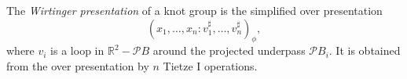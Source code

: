 The \textit{Wirtinger presentation} of a knot group is the simplified over presentation
$$(x_1, \ldots, x_n : v_1^\sharp, \ldots, v_n^\sharp)_\phi,$$
where $v_i$ is a loop in $\mathbb{R}^2 - \mathcal{P}B$ around the projected underpass $\mathcal{P}B_i$. It is obtained from the over presentation by $n$ Tietze I operations.
